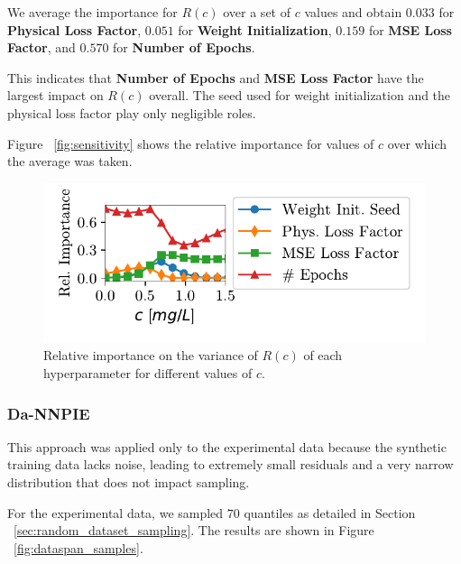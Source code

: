 We average the importance for $R(c)$ over a set of $c$ values and obtain $0.033$ for \textbf{Physical Loss Factor}, $0.051$ for \textbf{Weight Initialization}, $0.159$ for \textbf{MSE Loss Factor}, and $0.570$ for \textbf{Number of Epochs}.

This indicates that \textbf{Number of Epochs} and \textbf{MSE Loss Factor} have the largest impact on $R(c)$ overall. The seed used for weight initialization and the physical loss factor play only negligible roles.

Figure ~\vref{fig:sensitivity} shows the relative importance for values of $c$ over which the average was taken.

\begin{figure}[h]
    \centering
    \includegraphics{figs/sensitivity.pdf}
    \caption{Relative importance on the variance of $R(c)$ of each hyperparameter for different values of $c$.}
    \label{fig:sensitivity}
\end{figure}




\subsubsection{Da-NNPIE}
This approach was applied only to the experimental data because the synthetic training data lacks noise, leading to extremely small residuals and a very narrow distribution that does not impact sampling. %

For the experimental data, we sampled $70$ quantiles as detailed in Section ~\vref{sec:random_dataset_sampling}. The results are shown in Figure ~\vref{fig:dataspan_samples}.


